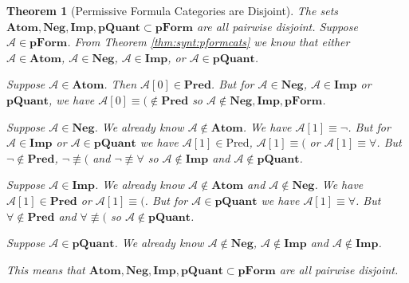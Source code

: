 \documentclass[12pt]{article}
\theoremstyle{break}
\theoremstyle{break}
\newtheorem{theorem}{Theorem}[section]
\theoremstyle{break}
\theoremstyle{break}
\theoremstyle{break}
\newtheorem{informal definition}[definition]{Informal Definition}
\newcommand{\mc}[1]{\mathcal{#1}}
\begin{document}
\begin{theorem}[Permissive Formula Categories are Disjoint]
\label{thm:read:pformcatdisjoint}
The sets $\textbf{Atom}, \textbf{Neg}, \textbf{Imp}, \textbf{pQuant}\subset \textbf{pForm}$ are all pairwise disjoint.
Suppose $\mc{A}\in\textbf{pForm}$.
From Theorem \ref{thm:synt:pformcats} we know that either $\mc{A}\in\textbf{Atom}$, $\mc{A}\in\textbf{Neg}$, $\mc{A}\in\textbf{Imp}$, or $\mc{A}\in\textbf{pQuant}$.

Suppose $\mc{A}\in\textbf{Atom}$. Then $\mc{A}[0] \in \textbf{Pred}$. But for $\mc{A}\in \textbf{Neg}$, $\mc{A}\in\textbf{Imp}$ or $\textbf{pQuant}$, we have $\mc{A}[0] \equiv ( \not \in \textbf{Pred}$ so $\mc{A} \not \in \textbf{Neg}, \textbf{Imp}, \textbf{pForm}$.

Suppose $\mc{A}\in \textbf{Neg}$.
We already know $\mc{A}\not \in \textbf{Atom}$.
We have $\mc{A}[1] \equiv \lnot$.
But for $\mc{A}\in\textbf{Imp}$ or $\mc{A}\in\textbf{pQuant}$ we have $\mc{A}[1]\in \text{Pred}$, $\mc{A}[1]\equiv ($ or $\mc{A}[1]\equiv \forall$.
But $\lnot \not \in \textbf{Pred}$, $\lnot \not \equiv ($ and $\lnot\not \equiv \forall$ so $\mc{A}\not \in \textbf{Imp}$ and $\mc{A} \not \in \textbf{pQuant}$.

Suppose $\mc{A} \in \textbf{Imp}$.
We already know $\mc{A} \not \in \textbf{Atom}$ and $\mc{A} \not \in \textbf{Neg}$.
We have $\mc{A}[1] \in \textbf{Pred}$ or $\mc{A}[1]\equiv ($.
But for $\mc{A} \in \textbf{pQuant}$ we have $\mc{A}[1] \equiv \forall$.
But $\forall \not \in \textbf{Pred}$ and $\forall \not \equiv ($ so $\mc{A} \not \in \textbf{pQuant}$.

Suppose $\mc{A}\in\textbf{pQuant}$.
We already know $\mc{A} \not \in \textbf{Neg}$, $\mc{A}\not \in \textbf{Imp}$ and $\mc{A} \not \in \textbf{Imp}$.

This means that $\textbf{Atom}, \textbf{Neg}, \textbf{Imp}, \textbf{pQuant}\subset \textbf{pForm}$ are all pairwise disjoint.
\end{theorem}
\end{document}
